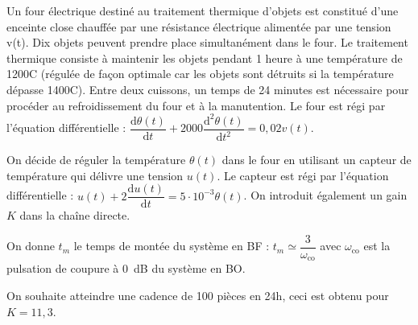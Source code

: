 \setcounter{exo}{0}
\begin{multicols}{2}




Un four électrique destiné au traitement thermique d'objets est constitué d'une enceinte close chauffée par une résistance électrique alimentée par une tension v(t). Dix objets peuvent prendre place simultanément dans le four. Le traitement thermique consiste à maintenir les objets pendant 1 heure à une température de 1200\degres C (régulée de façon optimale car les objets sont détruits si la température dépasse  1400\degres C).
Entre deux cuissons, un temps de 24 minutes est nécessaire pour procéder au refroidissement du four et à la manutention.
Le four est régi par l’équation différentielle : $\dfrac{\text{d}\theta(t)}{\text{d}t}+2000\dfrac{\text{d}^2\theta(t)}{\text{d}t^2}=0,02 v(t)$.



On décide de réguler la température $\theta(t)$ dans le four en utilisant un capteur de température qui délivre une tension $u(t)$. Le capteur est régi par l’équation différentielle :  $u(t)+2\dfrac{\text{d}u(t)}{\text{d}t}=5\cdot 10^{-3} \theta(t)$. On introduit également un gain $K$ dans la chaîne directe.



On donne $t_m$ le temps de montée du système en BF : $t_m\simeq \dfrac{3}{\omega_{\text{co}}}$ avec $\omega_{\text{co}}$ est la pulsation de coupure à \SI{0}{dB} du système en BO.  



On souhaite atteindre une cadence de 100 pièces en 24h, ceci est obtenu pour $K=11,3$.




\end{multicols}
